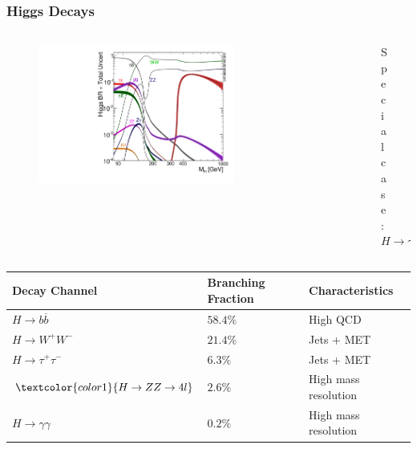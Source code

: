 \documentclass[xcolor={usenames,dvipsnames,svgnames,table}]{beamer}
\begin{document}
\begin{frame}
    \frametitle{Higgs Decays}
    \begin{columns}
    \begin{column}{0.49\textwidth}
        \begin{figure}[t]
            \includegraphics[width=0.75\textwidth]{plots/Higgs_BR.pdf}
        \end{figure}
    \end{column}
    \begin{column}{0.49\textwidth}
		\begin{figure}[t]
        \centering \textcolor{color1}{Special case: $H \rightarrow \gamma\gamma$}\\
        \vspace{0.5cm}
        \centering 
        \end{figure}
    \end{column}
    \end{columns}
    \begin{minipage}{1.\textwidth}
		\begin{center}
		\begin{table}[c]
        \centering
        \hspace*{-0.5cm}
        \begin{tabular}{l|l|l}
        Decay Channel                     & Branching Fraction & Characteristics      \\ \hline \hline
        $H \rightarrow b\overline{b}$     & $58.4\%$           & High QCD             \\ \hline
        $H \rightarrow W^+W^-$            & $21.4\%$           & Jets + MET           \\ \hline
        $H \rightarrow \tau^+ \tau^-$     & $6.3\%$           & Jets + MET		      \\ \hline
        $\textcolor{color1}{H \rightarrow ZZ \rightarrow 4l}$ & $2.6\%$           & High mass resolution \\ \hline
        $H \rightarrow \gamma \gamma$     & $0.2\%$          & High mass resolution \\
        \end{tabular}
        \end{table}
		\end{center}
    \end{minipage}
\end{frame}
\end{document}
